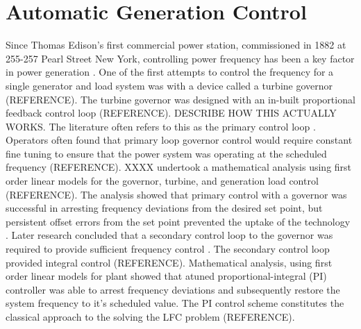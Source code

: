 \section{Automatic Generation Control}\label{agc}
Since Thomas Edison's first commercial power station, commissioned in 1882 at 255-257 Pearl Street New York, controlling power frequency has been a key factor in power generation \cite{Cohn1983}. One of the first attempts to control the frequency for a single generator and load system was with a device called a turbine governor (REFERENCE). The turbine governor was designed with an in-built proportional feedback control loop (REFERENCE). DESCRIBE HOW THIS ACTUALLY WORKS. The literature often refers to this as the primary control loop \cite{Bevrani2011}. Operators often found that primary loop governor control would require constant fine tuning to ensure that the power system was operating at the scheduled frequency (REFERENCE). XXXX undertook a mathematical analysis using first order linear models for the governor, turbine, and generation load control (REFERENCE). The analysis showed that primary control with a governor was successful in arresting frequency deviations from the desired set point, but persistent offset errors from the set point prevented the uptake of the technology \cite{Saadat}. Later research concluded that a secondary control loop to the governor was required to provide sufficient frequency control \cite{Elgerd1970}. The secondary control loop provided integral control (REFERENCE). Mathematical analysis, using first order linear models for plant showed that atuned proportional-integral (PI) controller was able to arrest frequency deviations and subsequently restore the system frequency to it's scheduled value. The PI control scheme constitutes the classical approach to the solving the LFC problem (REFERENCE).

